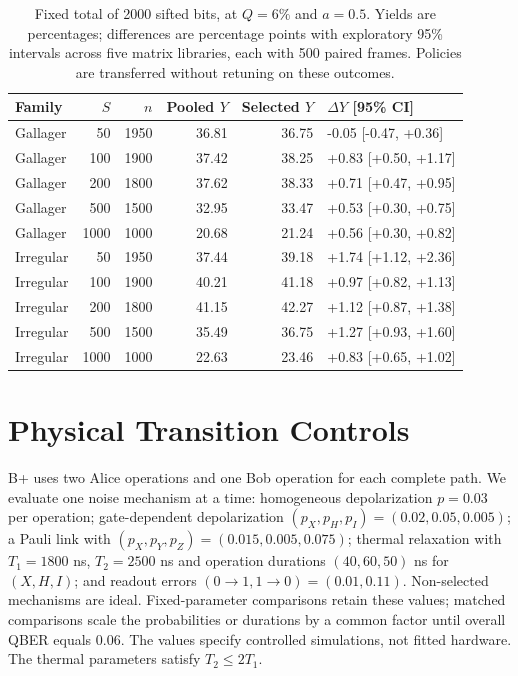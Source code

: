 \begin{table}[!htbp]
\centering
\small\setlength{\tabcolsep}{4pt}
\caption{Fixed total of 2000 sifted bits, at $Q=6\%$ and $a=0.5$. Yields are percentages; differences are percentage points with exploratory 95\% intervals across five matrix libraries, each with 500 paired frames. Policies are transferred without retuning on these outcomes.}
\label{tab:sample}
\begin{tabular}{@{}lrrrrl@{}}
\toprule
Family & $S$ & $n$ & Pooled $Y$ & Selected $Y$ & $\Delta Y$ [95\% CI] \\
\midrule
Gallager & 50 & 1950 & 36.81 & 36.75 & -0.05 [-0.47, +0.36] \\
Gallager & 100 & 1900 & 37.42 & 38.25 & +0.83 [+0.50, +1.17] \\
Gallager & 200 & 1800 & 37.62 & 38.33 & +0.71 [+0.47, +0.95] \\
Gallager & 500 & 1500 & 32.95 & 33.47 & +0.53 [+0.30, +0.75] \\
Gallager & 1000 & 1000 & 20.68 & 21.24 & +0.56 [+0.30, +0.82] \\
Irregular & 50 & 1950 & 37.44 & 39.18 & +1.74 [+1.12, +2.36] \\
Irregular & 100 & 1900 & 40.21 & 41.18 & +0.97 [+0.82, +1.13] \\
Irregular & 200 & 1800 & 41.15 & 42.27 & +1.12 [+0.87, +1.38] \\
Irregular & 500 & 1500 & 35.49 & 36.75 & +1.27 [+0.93, +1.60] \\
Irregular & 1000 & 1000 & 22.63 & 23.46 & +0.83 [+0.65, +1.02] \\
\bottomrule
\end{tabular}
\end{table}

\FloatBarrier
\section{Physical Transition Controls}
\label{app:physical}
B+ uses two Alice operations and one Bob operation for each complete path. We evaluate
one noise mechanism at a time: homogeneous depolarization $p=0.03$ per operation;
gate-dependent depolarization $(p_X,p_H,p_I)=(0.02,0.05,0.005)$; a Pauli link
with $(p_X,p_Y,p_Z)=(0.015,0.005,0.075)$; thermal relaxation with
$T_1=1800$ ns, $T_2=2500$ ns and operation durations $(40,60,50)$ ns for
$(X,H,I)$; and readout errors $(0\to1,1\to0)=(0.01,0.11)$.
Non-selected mechanisms are ideal. Fixed-parameter comparisons retain these values;
matched comparisons scale the probabilities or durations by a common factor until
overall QBER equals 0.06. The values specify controlled simulations, not fitted hardware.
The thermal parameters satisfy $T_2\leq2T_1$.

